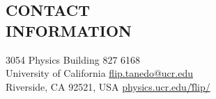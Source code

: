 \documentclass[margin,line]{resume}
\begin{document}
\begin{resume}



\section{\footnotesize \sc
\sffamily 
{}CONTACT\\INFORMATION
}

3054 Physics Building
\hfill 
{ 827 6168}
\vspace{0mm}%
\\
%
\vspace{0mm}%
University of California
\hfill
\href{mailto:flip.tanedo@ucr.edu}{\myweb flip.tanedo@ucr.edu}
\vspace{0mm}%
\\
\vspace{0mm}%
Riverside, CA 92521, USA
\hfill
\href{http://physics.ucr.edu/~flip/}{\myweb physics.ucr.edu/\~flip/}
\vspace{0mm}%
\\
\vspace{-4.5mm}%
\vspace{-2mm}

%
%
%



\end{resume}
\end{document}
